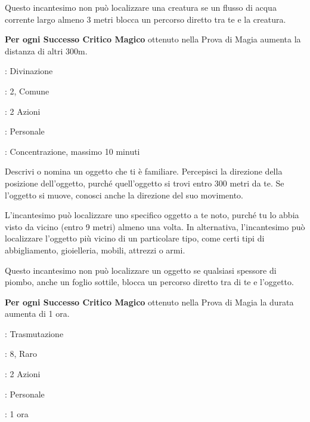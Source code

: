 \begin{multicols}{2}
Questo incantesimo non può localizzare una creatura se un flusso di acqua corrente largo almeno 3 metri blocca un percorso diretto tra te e la creatura.

\textbf{Per ogni Successo Critico Magico} ottenuto nella Prova di Magia aumenta la distanza di altri 300m.

\noindent\colorbox{OBSSgold!10}{
\begin{minipage}{0.95\linewidth}
\begin{description}[noitemsep, topsep=0pt, parsep=0pt, partopsep=0pt, leftmargin=0cm, labelwidth=1.3cm]
	\item[\textbf{Lista}]: Divinazione
	\item[\textbf{Livello}]: 2, Comune
	\item[\textbf{Lancio}]: 2 Azioni
	\item[\textbf{Gittata}]: Personale
	\item[\textbf{Durata}]: Concentrazione, massimo 10 minuti
\end{description}
\end{minipage}}\smallskip

Descrivi o nomina un oggetto che ti è familiare. Percepisci la direzione della posizione dell'oggetto, purché quell'oggetto si trovi entro 300 metri da te. Se l'oggetto si muove, conosci anche la direzione del suo movimento.

L'incantesimo può localizzare uno specifico oggetto a te noto, purché tu lo abbia visto da vicino (entro 9 metri) almeno una volta. In alternativa, l'incantesimo può localizzare l'oggetto più vicino di un particolare tipo, come certi tipi di abbigliamento, gioielleria, mobili, attrezzi o armi.

Questo incantesimo non può localizzare un oggetto se qualsiasi spessore di piombo, anche un foglio sottile, blocca un percorso diretto tra di te e l'oggetto.

\textbf{Per ogni Successo Critico Magico} ottenuto nella Prova di Magia la durata aumenta di 1 ora.

\noindent\colorbox{OBSSgold!10}{
\begin{minipage}{0.95\linewidth}
\begin{description}[noitemsep, topsep=0pt, parsep=0pt, partopsep=0pt, leftmargin=0cm, labelwidth=1.3cm]
	\item[\textbf{Lista}]: Trasmutazione
	\item[\textbf{Livello}]: 8, Raro
	\item[\textbf{Lancio}]: 2 Azioni
	\item[\textbf{Gittata}]: Personale
	\item[\textbf{Durata}]: 1 ora
\end{description}
\end{minipage}}\smallskip


\end{multicols}
